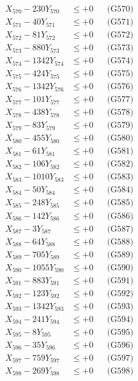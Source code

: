 \documentclass[a4paper,10pt]{article}
\begin{document}
{\begin{align}
X_{570} - 230Y_{570} &\leq +0 && \text{(G570)} \\
\allowbreak
X_{571} - 40Y_{571} &\leq +0 && \text{(G571)} \\
X_{572} - 81Y_{572} &\leq +0 && \text{(G572)} \\
X_{573} - 880Y_{573} &\leq +0 && \text{(G573)} \\
X_{574} - 1342Y_{574} &\leq +0 && \text{(G574)} \\
X_{575} - 424Y_{575} &\leq +0 && \text{(G575)} \\
X_{576} - 1342Y_{576} &\leq +0 && \text{(G576)} \\
X_{577} - 101Y_{577} &\leq +0 && \text{(G577)} \\
X_{578} - 438Y_{578} &\leq +0 && \text{(G578)} \\
X_{579} - 83Y_{579} &\leq +0 && \text{(G579)} \\
X_{580} - 455Y_{580} &\leq +0 && \text{(G580)} \\
\allowbreak
X_{581} - 61Y_{581} &\leq +0 && \text{(G581)} \\
X_{582} - 106Y_{582} &\leq +0 && \text{(G582)} \\
X_{583} - 1010Y_{583} &\leq +0 && \text{(G583)} \\
X_{584} - 50Y_{584} &\leq +0 && \text{(G584)} \\
X_{585} - 248Y_{585} &\leq +0 && \text{(G585)} \\
X_{586} - 142Y_{586} &\leq +0 && \text{(G586)} \\
X_{587} - 3Y_{587} &\leq +0 && \text{(G587)} \\
X_{588} - 64Y_{588} &\leq +0 && \text{(G588)} \\
X_{589} - 705Y_{589} &\leq +0 && \text{(G589)} \\
X_{590} - 1055Y_{590} &\leq +0 && \text{(G590)} \\
\allowbreak
X_{591} - 883Y_{591} &\leq +0 && \text{(G591)} \\
X_{592} - 123Y_{592} &\leq +0 && \text{(G592)} \\
X_{593} - 1342Y_{593} &\leq +0 && \text{(G593)} \\
X_{594} - 241Y_{594} &\leq +0 && \text{(G594)} \\
X_{595} - 8Y_{595} &\leq +0 && \text{(G595)} \\
X_{596} - 35Y_{596} &\leq +0 && \text{(G596)} \\
X_{597} - 759Y_{597} &\leq +0 && \text{(G597)} \\
X_{598} - 269Y_{598} &\leq +0 && \text{(G598)} \\

\end{align}}
\end{document}
